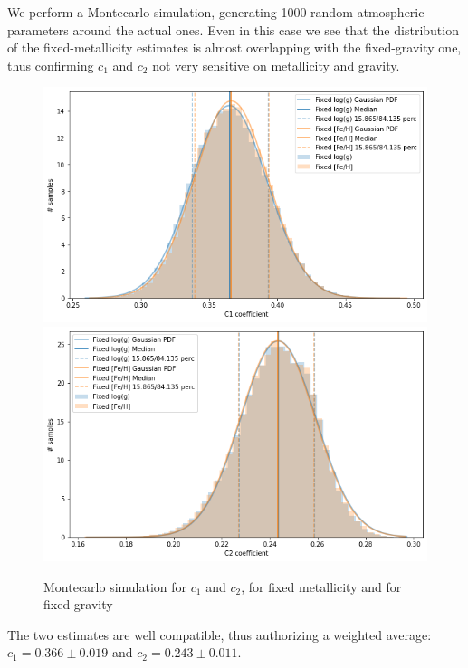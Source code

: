 \documentclass[a4paper,11pt,twocolumn]{article}
\begin{document}
We perform a Montecarlo simulation, generating 1000 random atmospheric 
parameters around the actual ones. Even in this case we see that the 
distribution of the fixed-metallicity estimates is almost overlapping 
with the fixed-gravity one, thus confirming $c_1$ and $c_2$ not very 
sensitive on metallicity and gravity.
\begin{figure}[H]
    \centering  
    \includegraphics[scale=0.35, angle=0]{../pictures/Claret2017/2017_c1_comp}
    \includegraphics[scale=0.35, angle=0]{../pictures/Claret2017/2017_c2_comp}
    \caption{Montecarlo simulation for $c_1$ and $c_2$, for fixed metallicity 
    and for fixed gravity}
\end{figure}
The two estimates are well compatible, thus authorizing a weighted average: 
$c_1 = 0.366 \pm 0.019$ and $c_2 = 0.243 \pm 0.011$.
\end{document}
